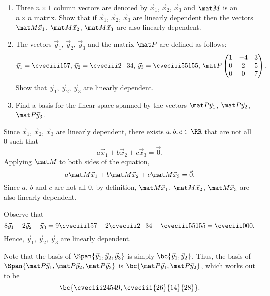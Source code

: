 \begin{problem}
    \begin{enumerate}
        \item Three $n \times 1$ column vectors are denoted by $\vec x_1$, $\vec x_2$, $\vec x_3$ and $\mat M$ is an $n \times n$ matrix. Show that if $\vec x_1$, $\vec x_2$, $\vec x_3$ are linearly dependent then the vectors $\mat M \vec x_1$, $\mat M \vec x_2$, $\mat M \vec x_3$ are also linearly dependent.
        \item The vectors $\vec y_1$, $\vec y_2$, $\vec y_3$ and the matrix $\mat P$ are defined as follows: \[\vec y_1 = \cveciii157, \, \vec y_2 = \cveciii2{-3}{4}, \, \vec y_3 = \cveciii5{51}{55}, \, \mat P \begin{pmatrix}1 & -4 & 3 \\ 0 & 2 & 5 \\ 0 & 0 & 7\end{pmatrix}.\] Show that $\vec y_1$, $\vec y_2$, $\vec y_3$ are linearly dependent.
        \item Find a basis for the linear space spanned by the vectors $\mat P \vec y_1$, $\mat P \vec y_2$, $\mat P \vec y_3$.
    \end{enumerate}
\end{problem}
\begin{solution}
    \begin{ppart}
        Since $\vec x_1$, $\vec x_2$, $\vec x_3$ are linearly dependent, there exists $a, b, c \in \RR$ that are not all 0 such that \[a \vec x_1 + b \vec x_2 + c \vec x_3 = \vec 0.\] Applying $\mat M$ to both sides of the equation, \[a \mat M \vec x_1 + b \mat M \vec x_2 + c \mat M \vec x_3 = \vec 0.\] Since $a$, $b$ and $c$ are not all 0, by definition, $\mat M \vec x_1$, $\mat M \vec x_2$, $\mat M \vec x_3$ are also linearly dependent.
    \end{ppart}
    \begin{ppart}
        Observe that \[8 \vec y_1 - 2 \vec y_2 - \vec y_3 = 9 \cveciii157 - 2 \cveciii2{-3}4 - \cveciii5{51}{55} = \cveciii000.\] Hence, $\vec y_1$, $\vec y_2$, $\vec y_3$ are linearly dependent.
    \end{ppart}
    \begin{ppart}
        Note that the basis of $\Span{\vec y_1, \vec y_2, \vec y_3}$ is simply $\bc{\vec y_1, \vec y_2}$. Thus, the basis of $\Span{\mat P \vec y_1, \mat P \vec y_2, \mat P \vec y_3}$ is $\bc{\mat P \vec y_1, \mat P \vec y_2}$, which works out to be \[\bc{\cveciii2{45}{49}, \cveciii{26}{14}{28}}.\]
    \end{ppart}
\end{solution}

